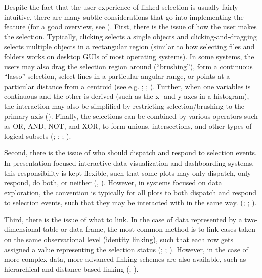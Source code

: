 \documentclass[
]{book}
\begin{document}
Despite the fact that the user experience of linked selection is usually fairly intuitive, there are many subtle considerations that go into implementing the feature (for a good overview, see ). First, there is the issue of how the user makes the selection. Typically, clicking selects a single objects and clicking-and-dragging selects multiple objects in a rectangular region (similar to how selecting files and folders works on desktop GUIs of most operating systems). In some systems, the users may also drag the selection region around (``brushing''), form a continuous ``lasso'' selection, select lines in a particular angular range, or points at a particular distance from a centroid (see e.g. ; ; ). Further, when one variables is continuous and the other is derived (such as the x- and y-axes in a histogram), the interaction may also be simplified by restricting selection/brushing to the primary axis (). Finally, the selections can be combined by various operators such as OR, AND, NOT, and XOR, to form unions, intersections, and other types of logical subsets (; ; ; ).

Second, there is the issue of who should dispatch and respond to selection events. In presentation-focused interactive data visualization and dashboarding systems, this responsibility is kept flexible, such that some plots may only dispatch, only respond, do both, or neither (, ). However, in systems focused on data exploration, the convention is typically for all plots to both dispatch and respond to selection events, such that they may be interacted with in the same way. (; ; ).

Third, there is the issue of what to link. In the case of data represented by a two-dimensional table or data frame, the most common method is to link cases taken on the same observational level (identity linking), such that each row gets assigned a value representing the selection status (; ; ). However, in the case of more complex data, more advanced linking schemes are also available, such as hierarchical and distance-based linking (; ).
\end{document}
